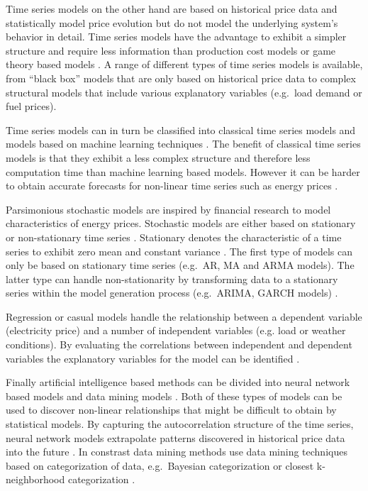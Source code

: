 Time series models on the other hand are based on historical price data and statistically model price evolution but do not model the underlying system's behavior in detail. Time series models have the advantage to exhibit a simpler structure and require less information than production cost models or game theory based models \cite{lora2007electricity}. A range of different types of time series models is available, from "`black box"' models that are only based on historical price data to complex structural models that include various explanatory variables (e.g.~load demand or fuel prices). 

Time series models can in turn be classified into classical time series models and models based on machine learning techniques \cite{lora2007electricity}. The benefit of classical time series models is that they exhibit a less complex structure and therefore less computation time than machine learning based models. However it can be harder to obtain accurate forecasts for non-linear time series such as energy prices \cite{lora2007electricity}. 

Parsimonious stochastic models are inspired by financial research to model characteristics of energy prices. Stochastic models are either based on stationary or non-stationary time series \cite{gonzalez2005modeling}. Stationary denotes the characteristic of a time series to exhibit zero mean and constant variance \cite{hyndman2012forecasting}. The first type of models can only be based on stationary time series (e.g.~AR, MA and ARMA models). The latter type can handle non-stationarity by transforming data to a stationary series within the model generation process (e.g.~ARIMA, GARCH models) \cite{hyndman2012forecasting, aggarwal2009electricity}. 

Regression or casual models handle the relationship between a dependent variable (electricity price) and a number of independent variables (e.g. load or weather conditions). By evaluating the correlations between independent and dependent variables the explanatory variables for the model can be identified \cite{aggarwal2009electricity}. 

Finally artificial intelligence based methods can be divided into neural network based models and data mining models \cite{aggarwal2009electricity}. 
Both of these types of models can be used to discover non-linear relationships that might be difficult to obtain by statistical models. By capturing the autocorrelation structure of the time series, neural network models extrapolate patterns discovered in historical price data into the future \cite{gonzalez2005modeling}. In constrast data mining methods use data mining techniques based on categorization of data, e.g.~Bayesian categorization or closest k-neighborhood categorization \cite{aggarwal2009electricity}. 


